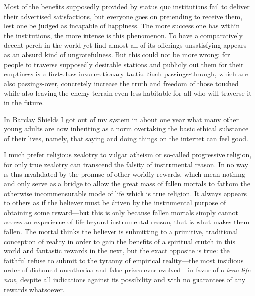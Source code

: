 \documentclass[12pt, twocolumn, oneside]{article}  	%
\begin{document}
\vspace{3em}

Most of the benefits supposedly provided by status quo institutions fail to deliver their advertised satisfactions, but everyone goes on pretending to receive them, lest one be judged as incapable of happiness. The more success one has within the institutions, the more intense is this phenomenon. To have a comparatively decent perch in the world yet find almost all of its offerings unsatisfying appears as an absurd kind of ungratefulness. But this could not be more wrong: for people to traverse supposedly desirable stations and publicly out them for their emptiness is a first-class insurrectionary tactic. Such passings-through, which are also passings-over, concretely increase the truth and freedom of those touched while also leaving the enemy terrain even less habitable for all who will traverse it in the future.

\newpage

\setcounter{page}{8}
\renewcommand{\thepage}{\arabic{page}}

In Barclay Shields I got out of my system in about one year what many other young adults are now inheriting as a norm overtaking the basic ethical substance of their lives, namely, that saying and doing things on the internet can feel good.

\vspace{3em}

I much prefer religious zealotry to vulgar atheism or so-called progressive religion, for only true zealotry can transcend the falsity of instrumental reason. In no way is this invalidated by  the promise of other-worldly rewards, which mean nothing and only serve as a bridge to allow the great mass of fallen mortals to fathom the otherwise incommensurable mode of life which is true religion. It always appears to others as if the believer must be driven by the instrumental purpose of obtaining some reward---but this is only because fallen mortals simply cannot access an experience of life beyond instrumental reason; that is what makes them fallen. The mortal thinks the believer is submitting to a primitive, traditional conception of reality in order to gain the benefits of a spiritual crutch in this world and fantastic rewards in the next, but the exact opposite is true: the faithful refuse to submit to the tyranny of empirical reality---the most insidious order of dishonest anesthesias and false prizes ever evolved---in favor of a \emph{true life now}, despite all indications against its possibility and with no guarantees of any rewards whatsoever.
\end{document}
